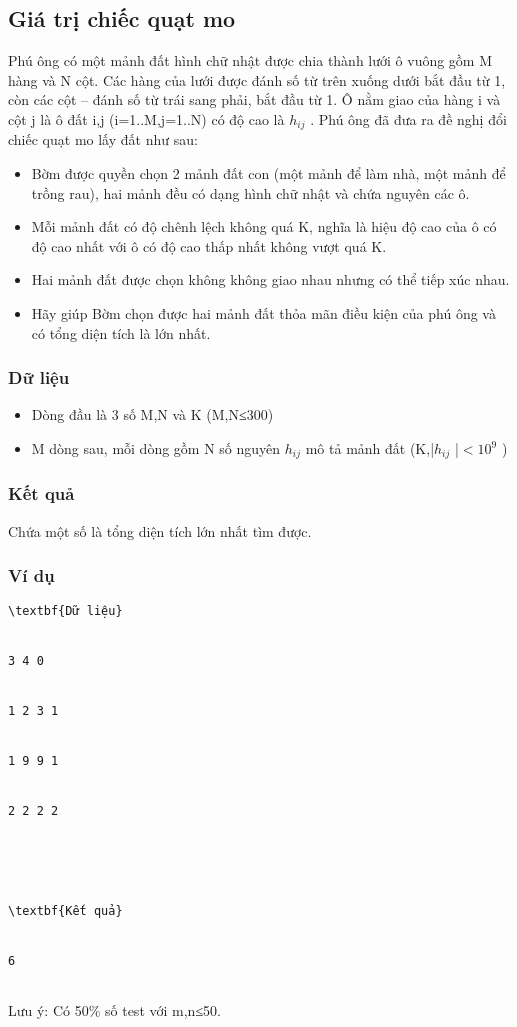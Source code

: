 







\subsection{   Giá trị chiếc quạt mo  }

   Phú ông có một mảnh đất hình chữ nhật được chia thành lưới ô vuông gồm M hàng và N cột. Các hàng của lưới được đánh số từ trên xuống dưới bắt đầu từ 1, còn các cột – đánh số từ trái sang phải, bắt đầu từ 1. Ô nằm giao của hàng i và cột j là ô đất i,j (i=1..M,j=1..N) có độ cao là $h_{ij}$   . Phú ông đã đưa ra đề nghị đổi chiếc quạt mo lấy đất như sau:  
\begin{itemize}
	\item     Bờm được quyền chọn 2 mảnh đất con (một mảnh để làm nhà, một mảnh để trồng rau), hai mảnh đều có dạng hình chữ nhật và chứa nguyên các ô.   
	\item     Mỗi mảnh đất có độ chênh lệch không quá K, nghĩa là hiệu độ cao của ô có độ cao nhất với ô có độ cao thấp nhất không vượt quá K.   
	\item     Hai mảnh đất được chọn không không giao nhau nhưng có thể tiếp xúc nhau.   
	\item     Hãy giúp Bờm chọn được hai mảnh đất thỏa mãn điều kiện của phú ông và có tổng diện tích là lớn nhất.   
\end{itemize}

\subsubsection{   Dữ liệu  }
\begin{itemize}
	\item     Dòng đầu là 3 số M,N và  K (M,N≤300)   
	\item     M dòng sau, mỗi dòng gồm N số nguyên $h_{ij}$    mô tả mảnh đất (K,|$h_{ij}$    |$<$$10^{9}$    )   
\end{itemize}

\subsubsection{   Kết quả  }

   Chứa một số là tổng diện tích lớn nhất tìm được.  

\subsubsection{   Ví dụ  }
\begin{verbatim}
\textbf{Dữ liệu}


3 4 0


1 2 3 1


1 9 9 1


2 2 2 2	





\textbf{Kết quả}


6


\end{verbatim}

   Lưu ý: Có 50\% số test với m,n≤50.  

